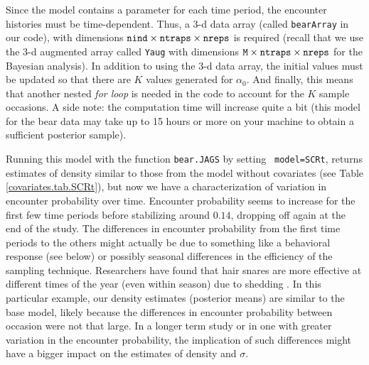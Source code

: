 Since the model contains a parameter for each time period, the
encounter histories must be time-dependent.  Thus, a 3-d data array
(called \mbox{\tt bearArray} in our code), with dimensions $\mbox{\tt
  nind} \times \mbox{\tt ntraps} \times \mbox{\tt nreps}$ is required
(recall that we use the 3-d augmented array called {\tt Yaug} with
dimensions $\mbox{\tt M} \times \mbox{\tt ntraps} \times \mbox{\tt
  nreps}$ for the Bayesian analysis). In addition to using the 3-d
data array, the initial values must be updated so that there are $K$
values generated for $\alpha_0$.  And finally, this means that another
nested {\it for loop} is needed in the code to account for the $K$
sample occasions.  A side note: the computation time will increase
quite a bit (this model for the bear data may take up to 15 hours or
more on your machine to obtain a sufficient posterior sample).

Running this model with the function {\tt bear.JAGS} by setting {\tt
  model=SCRt}, returns estimates of density similar to those from the
model without covariates (see Table \ref{covariates.tab.SCRt}), but
now we have a characterization of variation in encounter probability
over time.  Encounter probability seems to increase for the first few
time periods before stabilizing around $0.14$, dropping off again at
the end of the study.  The differences in encounter probability from
the first time periods to the others might actually be due to
something like a behavioral response (see below) or possibly seasonal
differences in the efficiency of the sampling technique.  Researchers
have found that hair snares are more effective at different times of
the year (even within season) due to shedding \citep{wegan_etal:2012}.
In this particular example, our density estimates (posterior means)
are similar to the base model, likely because the differences in
encounter probability between occasion were not that large.  In a
longer term study or in one with greater variation in the encounter
probability, the implication of such differences might have a bigger
impact on the estimates of density and $\sigma$.

